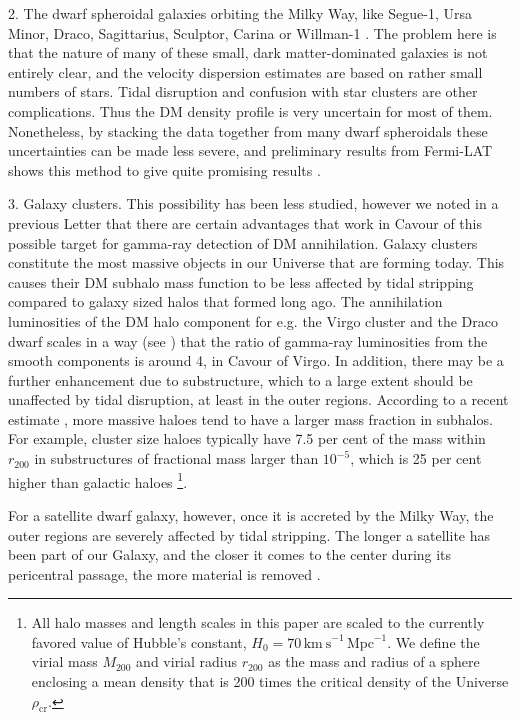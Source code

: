 \documentclass[10pt,aps,pra,reprint,amsmath,amsfonts,amssymb,showpacs,nofootinbib,floatfix]{revtex4-1}
\newcommand{\rmn}{\mathrm}
\newcommand{\rvir}{r_{200}}
\newcommand{\mvir}{M_{200}}
\begin{document}
2. The dwarf spheroidal galaxies orbiting the Milky Way, like Segue-1,
Ursa Minor, Draco, Sagittarius, Sculptor, Carina or Willman-1
\cite{2009JCAP...01..016B,2010ApJ...720.1174A,2010JCAP...01..031S,2010JCAP...01..031S}. The
problem here is that the nature of many of these small, dark
matter-dominated galaxies is not entirely clear, and the velocity
dispersion estimates are based on rather small numbers of stars. Tidal
disruption and confusion with star clusters are other
complications. Thus the DM density profile is very uncertain for most
of them. Nonetheless, by stacking the data together from many dwarf
spheroidals these uncertainties can be made less severe, and
preliminary results from Fermi-LAT shows this method to give quite
promising results \cite{garde}.

3. Galaxy clusters. This possibility has been less studied, however we
noted in a previous Letter \cite{2009PhRvL.103r1302P} that there are
certain advantages that work in Cavour of this possible target for
gamma-ray detection of DM annihilation.  Galaxy clusters constitute
the most massive objects in our Universe that are forming today. This
causes their DM subhalo mass function to be less affected by tidal
stripping compared to galaxy sized halos that formed long ago.  The
annihilation luminosities of the DM halo component for e.g. the Virgo
cluster and the Draco dwarf scales in a way (see
\cite{2009PhRvL.103r1302P}) that the ratio of gamma-ray luminosities
from the smooth components is around 4, in Cavour of Virgo. In
addition, there may be a further enhancement due to substructure,
which to a large extent should be unaffected by tidal disruption, at
least in the outer regions.  According to a recent estimate
\cite{2011MNRAS.410.2309G}, more massive haloes tend to have a larger
mass fraction in subhalos.  For example, cluster size haloes typically
have 7.5 per cent of the mass within $r_{200}$ in substructures of
fractional mass larger than $10^{-5}$, which is 25 per cent higher
than galactic haloes \footnote{All halo masses and length scales in
  this paper are scaled to the currently favored value of Hubble's
  constant, $H_0 = 70\, \rmn{km~s}^{-1}\,\rmn{Mpc}^{-1}$. We define
  the virial mass $\mvir$ and virial radius $\rvir$ as the mass and
  radius of a sphere enclosing a mean density that is 200 times the
  critical density of the Universe $\rho_{\rmn{cr}}$.}.

For a satellite dwarf galaxy, however, once it is accreted by the
Milky Way, the outer regions are severely affected by tidal
stripping. The longer a satellite has been part of our Galaxy, and the
closer it comes to the center during its pericentral passage, the more
material is removed \cite{2004MNRAS.355..819G}.
\end{document}
